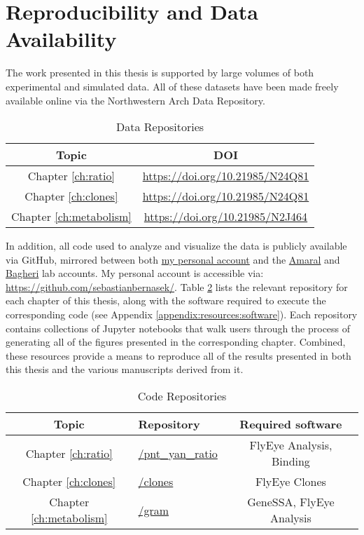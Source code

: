 \section{Reproducibility and Data Availability}
\label{appendix:resources:reproducibility}

The work presented in this thesis is supported by large volumes of both experimental and simulated data. All of these datasets have been made freely available online via the Northwestern Arch Data Repository. 

\begin{table}[h!]
\label{appendix:resources:data_repos}
\centering
\caption{Data Repositories}
\begin{tabular}{c c}
Topic & DOI \\ [0.5ex] 
\hline
Chapter \ref{ch:ratio} & \url{https://doi.org/10.21985/N24Q81} \\
Chapter \ref{ch:clones} & \url{https://doi.org/10.21985/N24Q81} \\
Chapter \ref{ch:metabolism} & \url{https://doi.org/10.21985/N2J464} \\ [1ex] 
\end{tabular}
\end{table}

In addition, all code used to analyze and visualize the data is publicly available via GitHub, mirrored between both \href{https://github.com/sebastianbernasek/}{my personal account} and the \href{https://github.com/amarallab}{Amaral} and \href{https://github.com/bagherilab}{Bagheri} lab accounts. My personal account is accessible via: \url{https://github.com/sebastianbernasek/}. Table \ref{appendix:resources:code_repos} lists the relevant repository for each chapter of this thesis, along with the software required to execute the corresponding code (see Appendix \ref{appendix:resources:software}). Each repository contains collections of Jupyter notebooks that walk users through the process of generating all of the figures presented in the corresponding chapter. Combined, these resources provide a  means to reproduce all of the results presented in both this thesis and the various manuscripts derived from it.

\begin{table}[h!]
\label{appendix:resources:code_repos}
\centering
\caption{Code Repositories}  
\begin{tabular}{c l c} 
Topic & Repository & Required software \\ [0.5ex] 
\hline
Chapter \ref{ch:ratio} & \href{https://github.com/sebastianbernasek/pnt\_yan\_ratio}{/pnt\_yan\_ratio} &  FlyEye Analysis, Binding \\
Chapter \ref{ch:clones} & \href{https://github.com/sebastianbernasek/clones}{/clones} & FlyEye Clones \\
Chapter \ref{ch:metabolism} & \href{https://github.com/sebastianbernasek/gram}{/gram} & GeneSSA, FlyEye Analysis \\ [1ex] 
\end{tabular}
\end{table}
